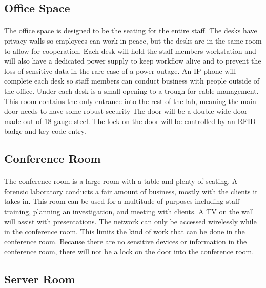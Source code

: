 \documentclass[12pt]{article}
\begin{document}
\subsection{Office Space}
\paragraph{} The office space is designed to be the seating for the entire staff.  
The desks have privacy walls so employees can work in peace, but the desks are in the same room to allow for cooperation.  
Each desk will hold the staff members workstation and will also have a dedicated power supply to keep workflow alive and to prevent the loss of sensitive data in the rare case of a power outage. 
An IP phone will complete each desk so staff members can conduct business with people outside of the office.
Under each desk is a small opening to a trough for cable management.
This room contains the only entrance into the rest of the lab, meaning the main door needs to have some robust security
The door will be a double wide door made out of 18-gauge steel.
The lock on the door will be controlled by an RFID badge and key code entry.
\subsection{Conference Room}
\paragraph{}
The conference room is a large room with a table and plenty of seating.  
A forensic laboratory conducts a fair amount of business, mostly with the clients it takes in.
This room can be used for a multitude of purposes including staff training, planning an investigation, and meeting with clients.
A TV on the wall will assist with presentations.
The network can only be accessed wirelessly while in the conference room.
This limits the kind of work that can be done in the conference room.
Because there are no sensitive devices or information in the conference room, there will not be a lock on the door into the conference room.

\subsection{Server Room}
\end{document}
